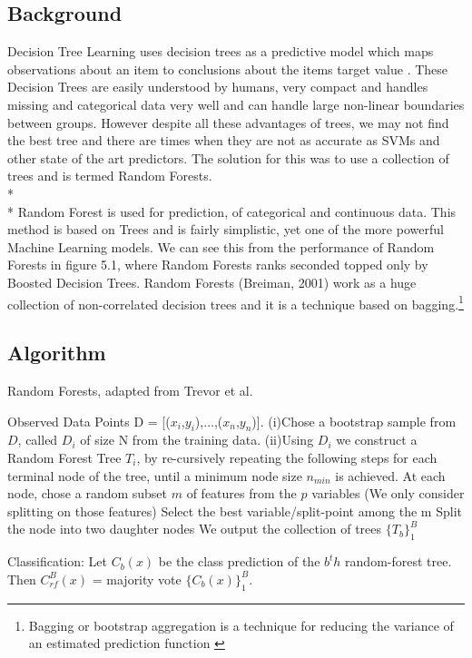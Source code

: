 \subsection{Background}
Decision Tree Learning uses decision trees as a predictive model which maps observations about an item to conclusions about the items target value \cite{42}. These Decision Trees are easily understood by humans, very compact and handles missing and categorical data very well and can handle large non-linear boundaries between groups. However despite all these advantages of trees, we may not find the best tree and there are times when they are not as accurate as SVMs and other state of the art predictors. The solution for this was to use a collection of trees and is termed Random Forests.\\*\\* 
Random Forest is used for prediction, of categorical and continuous data. This method is based on Trees and is fairly simplistic, yet one of the more powerful Machine Learning models. We can see this from the performance of Random Forests in figure 5.1, where Random Forests ranks seconded topped only by Boosted Decision Trees. Random Forests (Breiman, 2001) work as a huge collection of non-correlated decision trees and it is a technique based on bagging.\footnote{Bagging or bootstrap aggregation is a technique for reducing the variance of an estimated prediction function \cite{30}}
\subsection{Algorithm}
\begin{algorithm}[h!]
  \caption{Random Forests, adapted from Trevor et al. \cite{3}}
  \begin{algorithmic}[1]
  \State Observed Data Points D = [($x_i$,$y_i$),$\hdots$,($x_n$,$y_n$)]. 
  \State (i)Chose a bootstrap sample from $D$, called $D_i$ of size N from the 
  \State  training data.
  \State (ii)Using $D_i$ we construct a Random Forest Tree $T_i$, by re-cursively repeating
  \State  the following steps for each terminal node of the tree, until a minimum node 
  \State  size $n_{min}$ is achieved.
  \State At each node, chose a random subset $m$ of features from the $p$ variables
  \State (We only consider splitting on those features)
  \State Select the best variable/split-point among the m
  \State Split the node into two daughter nodes
  \EndWhile
   \EndFor
   \State We output the collection of trees $\{T_b\}_1^B$
  \end{algorithmic}
\end{algorithm}
Classification: Let $C_b(x)$ be the class prediction of the $b^th$ random-forest
tree. Then $C_{rf}^B(x)$ = majority vote $\{C_b(x)\}^B_1$.

